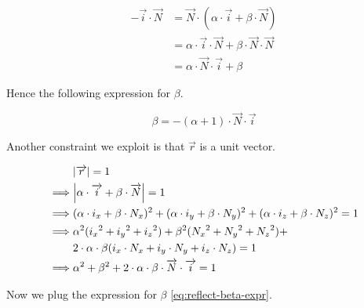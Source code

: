 \begin{equation} \begin{split}
- \overrightarrow{i} \cdot \overrightarrow{N} &=
\overrightarrow{N} \cdot
(\alpha \cdot \overrightarrow{i} + \beta \cdot \overrightarrow{N}) \\
&= \alpha \cdot \overrightarrow{i} \cdot \overrightarrow{N} +
   \beta \cdot \overrightarrow{N} \cdot \overrightarrow{N} \\
&= \alpha \cdot \overrightarrow{N} \cdot \overrightarrow{i} + \beta
\end{split} \end{equation}

Hence the following expression for $\beta$.

\begin{equation} \label{eq:reflect-beta-expr}
\beta = - (\alpha + 1) \cdot \overrightarrow{N} \cdot \overrightarrow{i}
\end{equation}

Another constraint we exploit is that $\overrightarrow{r}$ is a unit vector.

\begin{equation} \begin{split}
& \abs{\overrightarrow{r}} = 1 \\
\implies& \abs{\alpha \cdot \overrightarrow{i} +
                \beta \cdot \overrightarrow{N}} = 1 \\
\implies& (\alpha \cdot i_x + \beta \cdot N_x)^2 +
          (\alpha \cdot i_y + \beta \cdot N_y)^2 +
          (\alpha \cdot i_z + \beta \cdot N_z)^2 = 1 \\
\implies& \alpha^2 ({i_x}^2 + {i_y}^2 + {i_z}^2) +
          \beta^2 ({N_x}^2 + {N_y}^2 + {N_z}^2) + \\
          &2 \cdot \alpha \cdot \beta 
          (i_x \cdot N_x + i_y \cdot N_y + i_z \cdot N_z) = 1 \\
\implies& \alpha^2 + \beta^2 + 2 \cdot \alpha \cdot \beta \cdot
          \overrightarrow{N} \cdot \overrightarrow{i} = 1
\end{split} \end{equation}

Now we plug the expression for $\beta$ \cref{eq:reflect-beta-expr}.

